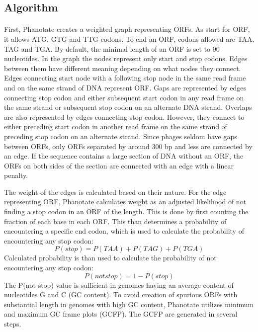 \subsection{Algorithm}
\paragraph*{}
First, Phanotate creates a weighted graph representing ORFs. As start for ORF, it allows ATG, GTG and TTG codons. To end an ORF, codons allowed are TAA, TAG and TGA. By default, the minimal length of an ORF is set to 90 nucleotides. In the graph the nodes represent only start and stop codons. Edges between them have different meaning depending on what nodes they connect. Edges connecting start node with a following stop node in the same read frame and on the same strand of DNA represent ORF. Gaps are represented by edges connecting stop codon and either subsequent start codon in any read frame on the same strand or subsequent stop codon on an alternate DNA strand. Overlaps are also represented by edges connecting stop codon. However, they connect to either preceding start codon in another read frame on the same strand of preceding stop codon on an alternate strand. Since phages seldom have gaps between ORFs, only ORFs separated by around 300 bp and less are connected by an edge. If the sequence contains a large section of DNA without an ORF, the ORFs on both sides of the section are connected with an edge with a linear penalty.

The weight of the edges is calculated based on their nature. For the edge representing ORF, Phanotate calculates weight as an adjusted likelihood of not finding a stop codon in an ORF of the length. This is done by first counting the fraction of each base in each ORF. This than determines a probability of encountering a specific end codon, which is used to calculate the probability of encountering any stop codon:
\[ P(stop) = P(TAA) + P(TAG) + P(TGA) \]
Calculated probability is than used to calculate the probability of not encountering any stop codon:
\[ P(not stop) = 1 - P(stop) \]
The P(not stop) value is sufficient in genomes having an average content of nucleotides G and C (GC content). To avoid creation of spurious ORFs with substantial length in genomes with high GC content, Phanotate utilizes minimum and maximum GC frame plots (GCFP). The GCFP are generated in several steps. 

